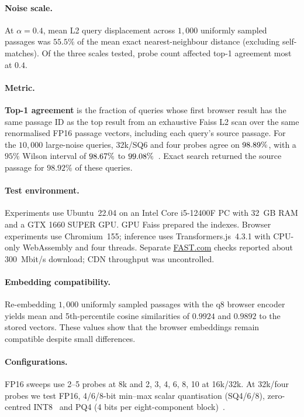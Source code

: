 \documentclass[sigconf, screen, review, balance=false]{acmart}
\begin{document}
\paragraph{Noise scale.}
At $\alpha=0.4$, mean L2 query displacement across $1{,}000$ uniformly sampled passages was $55.5\%$ of the mean exact nearest-neighbour distance (excluding self-matches). Of the three scales tested, probe count affected top-1 agreement most at $0.4$.

\paragraph{Metric.}
\textbf{Top-1 agreement} is the fraction of queries whose first browser result has the same passage ID as the top result from an exhaustive Faiss L2 scan over the same renormalised FP16 passage vectors, including each query's source passage. For the $10{,}000$ large-noise queries, 32k/SQ6 and four probes agree on $98.89{}\%$, with a $95\%$ Wilson interval of $98.67{}\%$ to $99.08{}\%$~\cite{wilson1927}.
Exact search returned the source passage for $98.92\%$ of these queries.

\paragraph{Test environment.}
Experiments use Ubuntu~22.04 on an Intel Core i5-12400F PC with 32~GB RAM and a GTX 1660 SUPER GPU. GPU Faiss prepared the indexes. Browser experiments use Chromium~155; inference uses Transformers.js~4.3.1 with CPU-only WebAssembly and four threads. Separate \href{https://fast.com/}{FAST.com} checks reported about $300$~Mbit/s download; CDN throughput was uncontrolled.

\paragraph{Embedding compatibility.}
Re-embedding $1{,}000$ uniformly sampled passages with the q8 browser encoder yields mean and 5th-percentile cosine similarities of $0.9924$ and $0.9892$ to the stored vectors. These values show that the browser embeddings remain compatible despite small differences.

\paragraph{Configurations.}
FP16 sweeps use 2--5 probes at 8k and 2, 3, 4, 6, 8, 10 at 16k/32k. At 32k/four probes we test FP16, 4/6/8-bit min--max scalar quantisation (SQ4/6/8), zero-centred INT8~\cite{Faiss} and PQ4 (4 bits per eight-component block)~\cite{product-quantization}.
\end{document}
